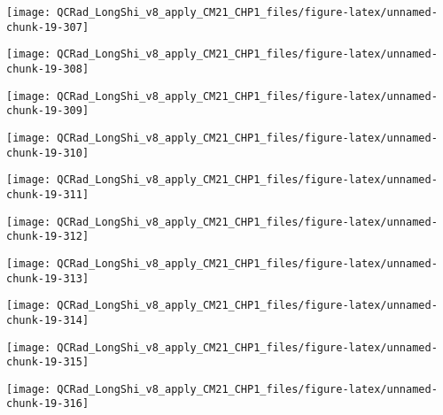 \documentclass[
  10pt,
  a4paper,oneside]{article}
\begin{document}
\begin{center}\texttt{[image: QCRad\_LongShi\_v8\_apply\_CM21\_CHP1\_files/figure-latex/unnamed-chunk-19-307]} \end{center}

\begin{center}\texttt{[image: QCRad\_LongShi\_v8\_apply\_CM21\_CHP1\_files/figure-latex/unnamed-chunk-19-308]} \end{center}

\begin{center}\texttt{[image: QCRad\_LongShi\_v8\_apply\_CM21\_CHP1\_files/figure-latex/unnamed-chunk-19-309]} \end{center}

\begin{center}\texttt{[image: QCRad\_LongShi\_v8\_apply\_CM21\_CHP1\_files/figure-latex/unnamed-chunk-19-310]} \end{center}

\begin{center}\texttt{[image: QCRad\_LongShi\_v8\_apply\_CM21\_CHP1\_files/figure-latex/unnamed-chunk-19-311]} \end{center}

\begin{center}\texttt{[image: QCRad\_LongShi\_v8\_apply\_CM21\_CHP1\_files/figure-latex/unnamed-chunk-19-312]} \end{center}

\begin{center}\texttt{[image: QCRad\_LongShi\_v8\_apply\_CM21\_CHP1\_files/figure-latex/unnamed-chunk-19-313]} \end{center}

\begin{center}\texttt{[image: QCRad\_LongShi\_v8\_apply\_CM21\_CHP1\_files/figure-latex/unnamed-chunk-19-314]} \end{center}

\begin{center}\texttt{[image: QCRad\_LongShi\_v8\_apply\_CM21\_CHP1\_files/figure-latex/unnamed-chunk-19-315]} \end{center}

\begin{center}\texttt{[image: QCRad\_LongShi\_v8\_apply\_CM21\_CHP1\_files/figure-latex/unnamed-chunk-19-316]} \end{center}
\end{document}
